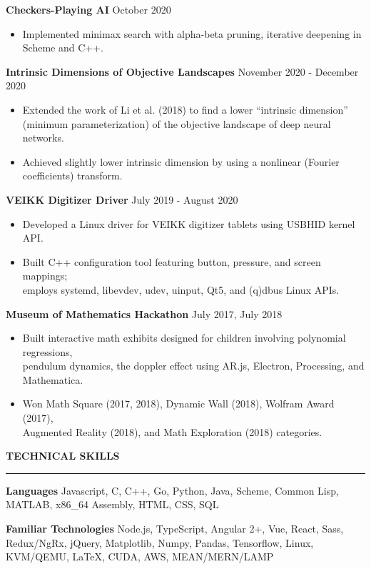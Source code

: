 \documentclass[]{article}
\newcommand{\br}{\vspace{10pt}}
\newcommand{\brs}{\vspace{3pt}}
\newcommand{\hr}{\vspace{4pt}\hrule\vspace{4pt}}
\begin{document}
\textbf{Checkers-Playing AI}
\hfill
October 2020
\begin{itemize}
\item Implemented minimax search with alpha-beta pruning, iterative
  deepening in Scheme and C++.
\end{itemize}

\brs

\textbf{Intrinsic Dimensions of Objective Landscapes}
\hfill
November 2020 - December 2020
\begin{itemize}
\item Extended the work of Li et al. (2018) to find a lower ``intrinsic
  dimension'' \\ (minimum parameterization) of the objective landscape of deep
  neural networks.
\item Achieved slightly lower intrinsic dimension by using a nonlinear (Fourier
  coefficients) transform.
\end{itemize}

\brs

\textbf{VEIKK Digitizer Driver}
\hfill
July 2019 - August 2020
\begin{itemize}
\item Developed a Linux driver for VEIKK digitizer tablets using USBHID kernel
  API.
\item Built C++ configuration tool featuring button, pressure, and screen
  mappings; \\
  employs systemd, libevdev, udev, uinput, Qt5, and (q)dbus Linux APIs.
\end{itemize}

\brs

\textbf{Museum of Mathematics Hackathon}
\hfill
July 2017, July 2018
\begin{itemize}
\item Built interactive math exhibits designed for children involving polynomial
  regressions, \\ pendulum dynamics, the doppler effect
  using AR.js, Electron, Processing, and Mathematica.
\item Won Math Square (2017, 2018), Dynamic Wall (2018), Wolfram Award (2017),
  \\ Augmented Reality (2018), and Math Exploration (2018) categories.
\end{itemize}

\br

\textbf{TECHNICAL SKILLS}
\hr

\textbf{Languages} Javascript, C, C++, Go, Python, Java, Scheme, Common Lisp,
MATLAB, x86\_64 Assembly, HTML, CSS, SQL

\brs

\textbf{Familiar Technologies} Node.js, TypeScript, Angular 2+, Vue, React,
Sass, Redux/NgRx, jQuery, Matplotlib, Numpy, Pandas, Tensorflow, Linux,
KVM/QEMU, \LaTeX, CUDA, AWS, MEAN/MERN/LAMP
\end{document}
